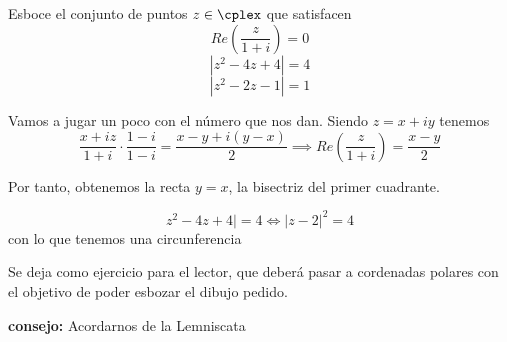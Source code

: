\begin{problem}[18]
Esboce el conjunto de puntos $z \in \cplex$ que satisfacen
\ppart \[Re\left( \frac{z}{1+i}\right) = 0\]
\ppart \[|z^2-4z+4| = 4\]
\ppart \[|z^2-2z-1|=1\]

\solution

\spart
Vamos a jugar un poco con el número que nos dan. Siendo $z=x+iy$ tenemos
\[\frac{x+iz}{1+i}\cdot\frac{1-i}{1-i} = \frac{x-y+i(y-x)}{2} \implies Re\left( \frac{z}{1+i}\right) = \frac{x-y}{2}\]

Por tanto, obtenemos la recta $y=x$, la bisectriz del primer cuadrante.

\spart
\[z^2-4z+4| = 4 \iff |z-2|^2 = 4 \]
con lo que tenemos una circunferencia

\spart
Se deja como ejercicio para el lector, que deberá pasar a cordenadas polares con el objetivo de poder esbozar el dibujo pedido.

\textbf{consejo:} Acordarnos de la Lemniscata
\end{problem}

